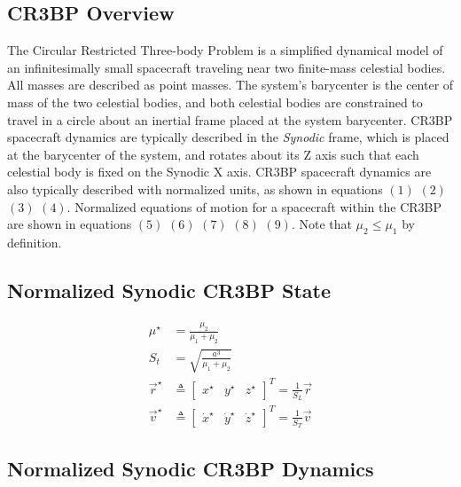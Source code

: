 \documentclass[conf]{new-aiaa}
\begin{document}
\begin{multicols*}{2}
\section{CR3BP Overview}
The Circular Restricted Three-body Problem is a simplified 
dynamical model of an infinitesimally small spacecraft traveling
near two finite-mass celestial bodies. All masses are described
as point masses. The system's barycenter is the 
center of mass of the two celestial bodies, and both celestial 
bodies are constrained to travel in a circle about an inertial 
frame placed at the system barycenter. CR3BP spacecraft dynamics are 
typically described in the \textit{Synodic} frame, which is placed
at the barycenter of the system, and rotates about its Z axis such 
that each celestial body is fixed on the Synodic X axis. 
CR3BP spacecraft dynamics are also typically described with 
normalized units,
as shown in equations $\left(1\right)$ $\left(2\right)$ $\left(3\right)$
$\left(4\right)$. Normalized equations of motion for a spacecraft 
within the CR3BP are shown in equations 
$\left(5\right)$ $\left(6\right)$ $\left(7\right)$ $\left(8\right)$
$\left(9\right)$. Note that $\mu_2 \leq \mu_1$ by definition.

\subsection*{Normalized Synodic CR3BP State}
\begin{align}
    \mu^\star & = \frac{\mu_2}{\mu_1+\mu_2} \\
    S_t & = \sqrt{\frac{a^3}{\mu_1+\mu_2}} \\
    \overrightarrow{r}^\star & \triangleq \begin{bmatrix} x^\star & y^\star & z^\star \end{bmatrix}^T  = \frac{1}{S_L} \overrightarrow{r} \\
    \overrightarrow{v}^\star & \triangleq \begin{bmatrix} \dot{x}^\star & \dot{y}^\star & \dot{z}^\star \end{bmatrix}^T  = \frac{1}{S_T} \overrightarrow{v}
\end{align}

\subsection*{Normalized Synodic CR3BP Dynamics}


\end{multicols*}
\end{document}
